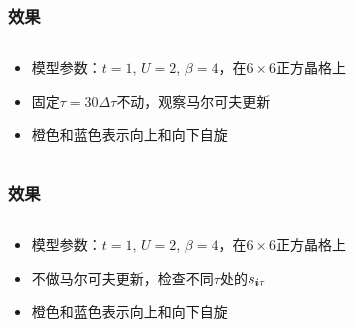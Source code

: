 \documentclass[UTF8]{ctexbeamer}
\begin{document}
\begin{frame}
\frametitle{效果}
    
\begin{columns}

\begin{column}{0.4\textwidth}
    \begin{itemize}
        \item 模型参数：$t=1$, $U=2$, $\beta=4$，在$6 \times 6$正方晶格上
        \item 固定$\tau = 30 \Delta \tau$不动，观察马尔可夫更新
        \item 橙色和蓝色表示向上和向下自旋
    \end{itemize}
\end{column}

\begin{column}{0.6\textwidth}
\end{column}

\end{columns}   
    
\end{frame}

\begin{frame}
\frametitle{效果}
    
\begin{columns}

\begin{column}{0.4\textwidth}
    \begin{itemize}
        \item 模型参数：$t=1$, $U=2$, $\beta=4$，在$6 \times 6$正方晶格上
        \item 不做马尔可夫更新，检查不同$\tau$处的$s_{\vb*{i} \tau}$
        \item 橙色和蓝色表示向上和向下自旋
    \end{itemize}
\end{column}

\begin{column}{0.6\textwidth}
\end{column}

\end{columns}   
    
\end{frame}
\end{document}
